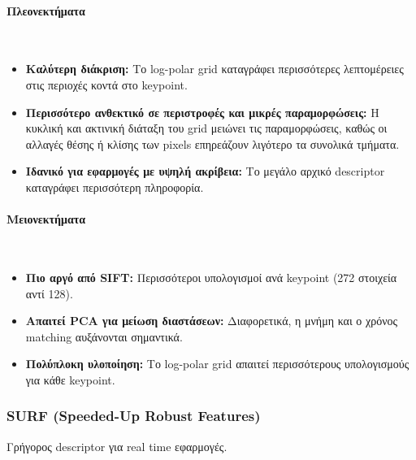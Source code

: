 \documentclass[12pt]{article}
\begin{document}
\paragraph{Πλεονεκτήματα}
\mbox{}\\
\begin{itemize}
  \item \textbf{Καλύτερη διάκριση:} Το log-polar grid καταγράφει περισσότερες λεπτομέρειες στις περιοχές κοντά στο keypoint.  
  \item \textbf{Περισσότερο ανθεκτικό σε περιστροφές και μικρές παραμορφώσεις:} Η κυκλική και ακτινική διάταξη του grid μειώνει τις παραμορφώσεις, καθώς οι αλλαγές θέσης ή κλίσης των pixels επηρεάζουν λιγότερο τα συνολικά τμήματα. 
  \item \textbf{Ιδανικό για εφαρμογές με υψηλή ακρίβεια:} Το μεγάλο αρχικό descriptor καταγράφει περισσότερη πληροφορία.
\end{itemize}




\paragraph{Μειονεκτήματα}
\mbox{}\\
\begin{itemize}
  \item \textbf{Πιο αργό από SIFT:} Περισσότεροι υπολογισμοί ανά keypoint (272 στοιχεία αντί 128). 
  \item \textbf{Απαιτεί PCA για μείωση διαστάσεων:} Διαφορετικά, η μνήμη και ο χρόνος matching αυξάνονται σημαντικά. 
  \item \textbf{Πολύπλοκη υλοποίηση:} Το log-polar grid απαιτεί περισσότερους υπολογισμούς για κάθε keypoint.
\end{itemize}


\subsubsection{SURF (Speeded-Up Robust Features)}
Γρήγορος descriptor για real time εφαρμογές.
\end{document}
